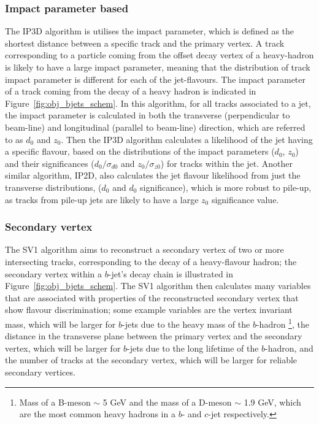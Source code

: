 \subsubsection{Impact parameter based}
\label{sec:obj-bjets_IP}

The IP3D algorithm is utilises the impact parameter, which is defined as the shortest distance between a specific track and the primary vertex.
A track corresponding to a particle coming from the offset decay vertex of a heavy-hadron is likely to have a large impact parameter,
meaning that the distribution of track impact parameter is different for each of the jet-flavours.
The impact parameter of a track coming from the decay of a heavy hadron is indicated in Figure~\ref{fig:obj_bjets_schem}.
In this algorithm, for all tracks associated to a jet, the impact parameter is calculated in both the transverse (perpendicular to beam-line)
and longitudinal (parallel to beam-line) direction, which are referred to as $d_{0}$ and $z_{0}$.
Then the IP3D algorithm calculates a likelihood of the jet having a specific flavour, 
based on the distributions of the impact parameters ($d_{0}$, $z_{0}$) and their significances 
($d_{0}/\sigma _{d0}$ and  $z_{0}/\sigma_{z0}$) for tracks within the jet. 
Another similar algorithm, IP2D, also calculates the jet flavour likelihood from just the transverse distributions, ($d_{0}$ and $d_{0}$ significance), which is more
robust to pile-up, as tracks from pile-up jets are likely to have a large $z_{0}$ significance value.

\subsubsection{Secondary vertex}
\label{sec:obj-bjets_SV}


The SV1 algorithm aims to reconstruct a secondary vertex of two or more intersecting tracks, corresponding to the decay of a heavy-flavour hadron;
the secondary vertex within a $b$-jet's decay chain is illustrated in Figure~\ref{fig:obj_bjets_schem}.
The SV1 algorithm then calculates many variables that are associated with properties of the reconstructed secondary vertex that show flavour discrimination;
some example variables are the vertex invariant mass,
which will be larger for $b$-jets due to the heavy mass of the $b$-hadron
\footnote{Mass of a B-meson $\sim$ 5 GeV and the mass of a D-meson $\sim$ 1.9 GeV, which are the most common heavy hadrons in a $b$- and $c$-jet respectively.}, 
the distance in the transverse plane between the primary vertex and the secondary vertex, %
which will be larger for $b$-jets due to the long lifetime of the $b$-hadron,
and the number of tracks at the secondary vertex, which will be larger for reliable secondary vertices.

